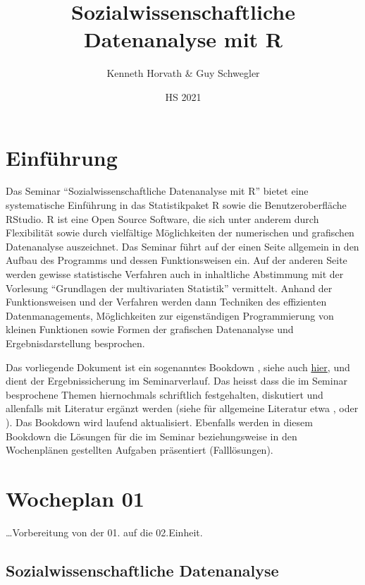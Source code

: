 \documentclass[
]{book}
\title{Sozialwissenschaftliche Datenanalyse mit R}
\author{Kenneth Horvath \& Guy Schwegler}
\date{HS 2021}
\begin{document}
\maketitle

{
\setcounter{tocdepth}{1}
\tableofcontents
}
\hypertarget{einfuxfchrung}{%
\chapter*{Einführung}\label{einfuxfchrung}}

Das Seminar ``Sozialwissenschaftliche Datenanalyse mit R'' bietet eine systematische Einführung in das Statistikpaket R sowie die Benutzeroberfläche RStudio. R ist eine Open Source Software, die sich unter anderem durch Flexibilität sowie durch vielfältige Möglichkeiten der numerischen und grafischen Datenanalyse auszeichnet. Das Seminar führt auf der einen Seite allgemein in den Aufbau des Programms und dessen Funktionsweisen ein. Auf der anderen Seite werden gewisse statistische Verfahren auch in inhaltliche Abstimmung mit der Vorlesung ``Grundlagen der multivariaten Statistik'' vermittelt. Anhand der Funktionsweisen und der Verfahren werden dann Techniken des effizienten Datenmanagements, Möglichkeiten zur eigenständigen Programmierung von kleinen Funktionen sowie Formen der grafischen Datenanalyse und Ergebnisdarstellung besprochen.

Das vorliegende Dokument ist ein sogenanntes Bookdown \citep{R-bookdown}, siehe auch \href{https://bookdown.org/}{hier}, und dient der Ergebnissicherung im Seminarverlauf. Das heisst dass die im Seminar besprochene Themen hiernochmals schriftlich festgehalten, diskutiert und allenfalls mit Literatur ergänzt werden (siehe für allgemeine Literatur etwa \citet{DiazBone2019}, \citet{Kabacoff2015} oder \citet{Manderscheid2017}). Das Bookdown wird laufend aktualisiert. Ebenfalls werden in diesem Bookdown die Lösungen für die im Seminar beziehungsweise in den Wochenplänen gestellten Aufgaben präsentiert (Falllösungen).

\hypertarget{wocheplan-01}{%
\chapter{Wocheplan 01}\label{wocheplan-01}}

\ldots Vorbereitung von der 01. auf die 02.Einheit.

\hypertarget{sozialwissenschaftliche-datenanalyse}{%
\section{Sozialwissenschaftliche Datenanalyse}\label{sozialwissenschaftliche-datenanalyse}}
\end{document}
